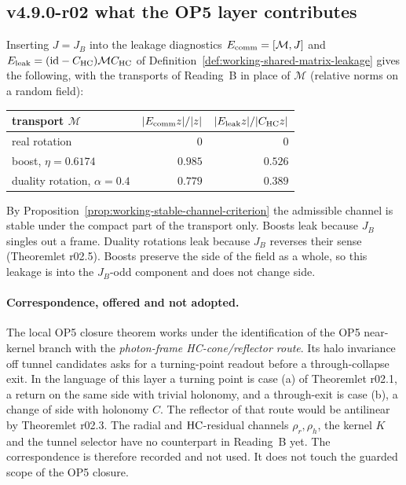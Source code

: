 \subsection*{v4.9.0-r02 what the OP5 layer contributes}
\label{subsec:v490-r02-op5}

Inserting \(J=J_B\) into the leakage diagnostics \(E_{\rm comm}=[\mathcal M,J]\) and
\(E_{\rm leak}=(\mathrm{id}-C_{\mathrm{HC}})\mathcal MC_{\mathrm{HC}}\) of Definition~\ref{def:working-shared-matrix-leakage} gives the
following, with the transports of Reading~B in place of \(\mathcal M\) (relative norms on a random field):
\begin{center}
\small
\begin{tabular}{@{}lrr@{}}
\toprule
transport \(\mathcal M\) & \(|E_{\rm comm}z|/|z|\) & \(|E_{\rm leak}z|/|C_{\mathrm{HC}}z|\)\\
\midrule
real rotation & \(0\) & \(0\)\\
boost, \(\eta=0.6174\) & \(0.985\) & \(0.526\)\\
duality rotation, \(\alpha=0.4\) & \(0.779\) & \(0.389\)\\
\bottomrule
\end{tabular}
\end{center}
By Proposition~\ref{prop:working-stable-channel-criterion} the admissible channel is stable under the compact part of
the transport only.  Boosts leak because \(J_B\) singles out a frame.  Duality rotations leak because \(J_B\) reverses
their sense (Theoremlet r02.5).  Boosts preserve the side of the field as a whole, so this leakage is into the
\(J_B\)-odd component and does not change side.

\paragraph{Correspondence, offered and not adopted.}
The local OP5 closure theorem works under the identification of the OP5 near-kernel branch with the
\emph{photon-frame HC-cone/reflector route}.  Its halo invariance off tunnel candidates asks for a turning-point
readout before a through-collapse exit.  In the language of this layer a turning point is case (a) of Theoremlet r02.1,
a return on the same side with trivial holonomy, and a through-exit is case (b), a change of side with holonomy \(C\).
The reflector of that route would be antilinear by Theoremlet r02.3.  The radial and \(\mathrm{HC}\)-residual channels
\(\rho_r,\rho_h\), the kernel \(K\) and the tunnel selector have no counterpart in Reading~B yet.  The correspondence is
therefore recorded and not used.  It does not touch the guarded scope of the OP5 closure.

